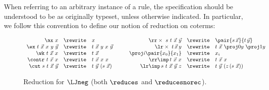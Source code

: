 
When referring to an arbitrary instance of a rule, the specification should be understood to be as originally typeset, unless otherwise indicated.
In particular, we follow this convention to define our notion of reduction on coterms:


\begin{figure}
    \centering
\[
\begin{array}{rcl}
  \ax \  x   &\rewrite  & x \\
\ex \ t \ \vec x \ x \ y \ \vec y&\rewrite& t\  \vec x  \ y \ x \ \vec y  \\
\wk \ t \  \vec x\  x     & \rewrite & t\  \vec x\\
\contr \ t \ \vec x\ x &\rewrite&  t \ \vec x \ x \ x \\
\cut \ s \ t \ \vec x\ \vec y &\rewrite& t \ \vec y \ (s \ \vec x)
\end{array}
\qquad
\begin{array}{rcl}
     {\rr \times \ s \ t \ \vec x \ \vec y }&\rewrite& \pair {  s\, \vec x}{t\,  \vec  y}
\\
 \lr \times \ t \, \vec x  \,y & \rewrite &  t\ \vec x \ \proj 0 y\ \proj 1 y 
 \\
 \proj i \pair {x_0} {x_1} & \rewrite & x_i \\
 \rr \imp \, t  \ \vec x \ x  &\rewrite&  t  \ \vec x \ x \\ 
\lr \imp \, s \ t  \ \vec x\ \vec y \ z  &\rewrite& t \ \vec y \ (z  \, (s \ \vec x )) 
\end{array}
\]
    \caption{Reduction for $\LJneg$ (both $\reduces$ and $\reducesnorec$). }
    \label{fig:reduction-ljneg}
\end{figure}


